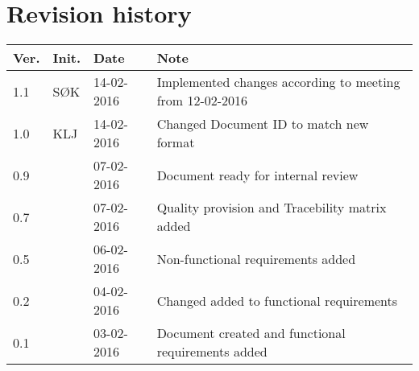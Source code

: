 \label{chp_revisionHistory}
\chapter{Revision history}

\begin{tabular}{b{1cm} b{1cm} b{2cm} b{8cm}}
    \textbf{Ver.} & \textbf{Init.} & \textbf{Date} & \textbf{Note} \\
    \hline
    1.1 & SØK & 14-02-2016 & Implemented changes according to meeting from 12-02-2016 \\ 
    1.0 & KLJ & 14-02-2016 & Changed Document ID to match new format \\
    0.9 &  & 07-02-2016 & Document ready for internal review \\
    0.7 &  & 07-02-2016 & Quality provision and Tracebility matrix added \\
    0.5 &  & 06-02-2016 & Non-functional requirements added \\
	0.2 &  & 04-02-2016 & Changed added to functional requirements \\
    0.1 &  & 03-02-2016 & Document created and functional requirements added  \\
\end{tabular}